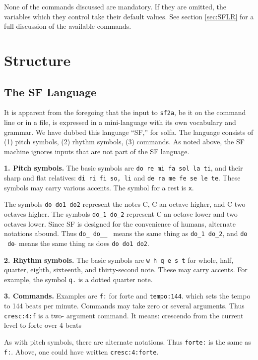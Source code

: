 \documentclass[11pt]{amsart}
\newcommand{\mcaret}{$\hat{}$}
\newcommand{\mmcaret}{$\hat{}\;\hat{}$}
\newcommand{\strong}[1]{{\bf #1}}
\begin{document}
None of the commands discussed are mandatory.  If they are omitted, the variables which they
control take their default values.  See section \ref{sec:SFLR} for a full discussion of the
available commands.

\section{Structure}

\subsection{The SF Language}

It is apparent from the foregoing that the input to {\tt sf2a}, be it 
on the command line or in a file, is  expressed in a mini-language with its
own vocabulary and grammar.  We have dubbed this language ``SF,'' for solfa.
The language consists of (1) pitch symbols, (2) rhythm symbols, (3) commands.
As noted above, the SF machine ignores inputs that are not part of the SF language.


\strong{1. Pitch symbols.}  The basic symbols are {\tt do re mi fa sol la ti}, and their
sharp and flat relatives: {\tt di ri fi so, li} and {\tt de ra me fe se le te}.
These symbols may carry various accents.  The symbol for a rest is {\tt x}.

The symbols {\tt do do1 do2} represent the 
notes C, C an octave higher, and C two octaves higher.  The symbols {\tt do\_1 do\_2}
represent C an octave lower and two octaves lower.  Since SF is designed for the 
convenience of humans, alternate notations abound.  Thus {\tt do\_ do\_\_ } means
the same thing as {\tt do\_1 do\_2}, and {\tt do\mcaret\ do{\mmcaret}} means the same thing
as does {\tt do do1 do2}.

\strong{2. Rhythm symbols.}  The basic symbols are {\tt w h q e s t} for whole, half, quarter, eighth,
sixteenth, and thirty-second note.  These may carry accents.  For example, the symbol {\tt q.} is a dotted 
quarter note.

\strong{3. Commands.} Examples are {\tt f:} for forte and {\tt tempo:144}. 
which sets the tempo to 144
beats per minute.  Commands may take zero or several arguments.  Thus {\tt cresc:4:f} is a two-
argument
command.  It means: crescendo from the current level to forte over 4 beats

As with pitch symbols, there are alternate notations.  Thus {\tt forte:} is the same as 
{\tt f:}. Above, one could have written {\tt cresc:4:forte}. 
\end{document}
